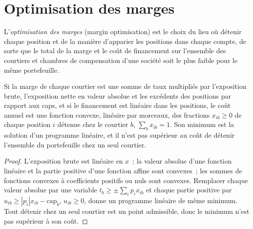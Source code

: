 \label{lst:fm:treasury-and-funding:rules}

\section{Optimisation des marges}

\begin{definition}\label{def:fm:treasury-and-funding:optim}
L'\emph{optimisation des marges} (margin optimisation) est le choix du lieu où détenir chaque position et de la manière d'apparier les positions dans chaque compte,
de sorte que le total de la marge et le coût de financement sur l'ensemble des courtiers et chambres de compensation d'une société soit le plus faible pour le même portefeuille.
\end{definition}

\begin{proposition}\label{prop:fm:treasury-and-funding:lp}
Si la marge de chaque courtier est une somme de taux multipliés par l'exposition brute, l'exposition nette en valeur absolue et les excédents des positions par rapport aux caps, et si le financement est linéaire
dans les positions, le coût annuel est une fonction convexe, linéaire par morceaux, des fractions $x_{ib}\ge0$ de chaque position $i$ détenue chez le courtier $b$,
$\sum_bx_{ib}=1$. Son minimum est la solution d'un programme linéaire, et il n'est pas supérieur au coût de détenir l'ensemble du portefeuille chez un seul
courtier.
\end{proposition}

\begin{proof}
L'exposition brute est linéaire en $x$~; la valeur absolue d'une fonction linéaire et la partie positive d'une fonction affine sont convexes~; les sommes de fonctions convexes
à coefficients positifs ou nuls sont convexes. Remplacer chaque valeur absolue par une variable $t_b\ge\pm\sum_ip_ix_{ib}$ et chaque partie positive par
$u_{ib}\ge|p_i|x_{ib}-\text{cap}_b$, $u_{ib}\ge0$, donne un programme linéaire de même minimum. Tout détenir chez un seul courtier est un
point admissible, donc le minimum n'est pas supérieur à son coût.
\end{proof}

